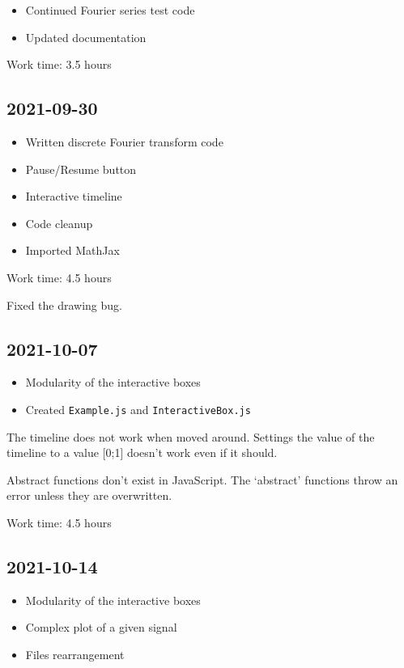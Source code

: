 \documentclass{article}
\begin{document}
\begin{itemize}
    \item Continued Fourier series test code
    \item Updated documentation
\end{itemize}

Work time: 3.5 hours

\subsection*{2021-09-30}

\begin{itemize}
    \item Written discrete Fourier transform code
    \item Pause/Resume button
    \item Interactive timeline
    \item Code cleanup
    \item Imported MathJax
\end{itemize}

Work time: 4.5 hours

Fixed the drawing bug.

\subsection*{2021-10-07}

\begin{itemize}
    \item Modularity of the interactive boxes
    \item Created \texttt{Example.js} and \texttt{InteractiveBox.js}
\end{itemize}

The timeline does not work when moved around.
Settings the value of the timeline to a value [0;1]
doesn't work even if it should.

Abstract functions don't exist in JavaScript.
The `abstract' functions throw an error unless they are overwritten.

Work time: 4.5 hours

\subsection*{2021-10-14}

\begin{itemize}
    \item Modularity of the interactive boxes
    \item Complex plot of a given signal
    \item Files rearrangement
\end{itemize}
\end{document}
